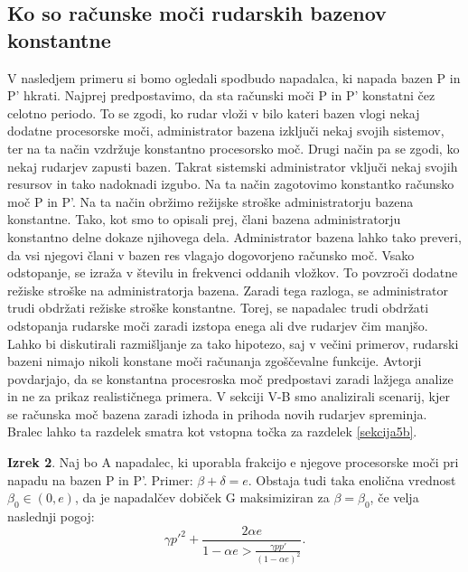 \documentclass{acm_proc_article-sp}
\begin{document}
\subsection{Ko so računske moči rudarskih bazenov konstantne} \label{sekcija5a}
V nasledjem primeru si bomo ogledali spodbudo napadalca, ki napada bazen P in P' hkrati. Najprej predpostavimo, da sta računski moči P in P' konstatni čez celotno periodo. To se zgodi, ko rudar vloži v bilo kateri bazen vlogi nekaj dodatne procesorske moči, administrator bazena izključi nekaj svojih sistemov, ter na ta način vzdržuje konstantno procesorsko moč. Drugi način pa se zgodi, ko nekaj rudarjev zapusti bazen. Takrat sistemski administrator vključi nekaj svojih resursov in tako nadoknadi izgubo. Na ta način zagotovimo konstantko računsko moč P in P'. Na ta način obržimo režijske stroške administratorju bazena konstantne. Tako, kot smo to opisali prej, člani bazena administratorju konstantno delne dokaze njihovega dela. Administrator bazena lahko tako preveri, da vsi njegovi člani v bazen res vlagajo dogovorjeno računsko moč. Vsako odstopanje, se izraža v številu in frekvenci oddanih vložkov. To povzroči dodatne režiske stroške na administratorja bazena. Zaradi tega razloga, se administrator trudi obdržati režiske stroške konstantne. Torej, se napadalec trudi obdržati odstopanja rudarske moči zaradi izstopa enega ali dve rudarjev čim manjšo. Lahko bi diskutirali razmišljanje za tako hipotezo, saj v večini primerov, rudarski bazeni nimajo nikoli konstane moči računanja zgoščevalne funkcije. Avtorji povdarjajo, da se konstantna procesroska moč predpostavi zaradi lažjega analize in ne za prikaz realističnega primera. V sekciji V-B smo analizirali scenarij, kjer se računska moč bazena zaradi izhoda in prihoda novih rudarjev spreminja. Bralec lahko ta razdelek smatra kot vstopna točka za razdelek \ref{sekcija5b}.

\textbf{Izrek 2}. Naj bo A napadalec, ki uporabla frakcijo e njegove procesorske moči pri napadu na bazen P in P'. Primer: $\beta + \delta = e$. Obstaja tudi taka enolična vrednost $\beta_0 \in (0, e)$, da je napadalčev dobiček G maksimiziran za $\beta = \beta_0$, če velja naslednji pogoj:
\begin{equation}
\gamma p'^2 + \frac{2\alpha e}{1 - \alpha e > \frac{\gamma p p'}{(1 - \alpha e)^2}}.
\end{equation}
\end{document}
